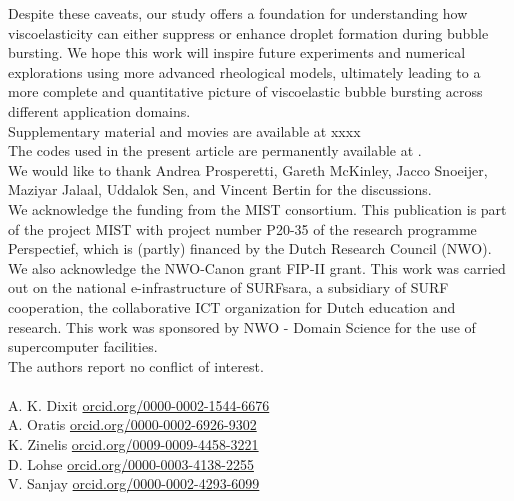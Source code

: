 \documentclass{jfm}
\newcommand{\bb}{\color{black} \normalfont}
\begin{document}
Despite these caveats, our study offers a foundation for understanding how viscoelasticity can either suppress or enhance droplet formation during bubble bursting. We hope this work will inspire future experiments and numerical explorations using more advanced rheological models, ultimately leading to a more complete and quantitative picture of viscoelastic bubble bursting across different application domains.
\bb\\


 \label{SM} Supplementary material and movies are available at xxxx \\

 The codes used in the present article are permanently available at \citet{Sanjay2024code}.\\

 We would like to thank Andrea Prosperetti, Gareth McKinley, Jacco Snoeijer, Maziyar Jalaal, Uddalok Sen, and Vincent Bertin for the discussions.\\

 We acknowledge the funding from the MIST consortium. This publication is part of the project MIST with project number P20-35 of the research programme Perspectief, which is (partly) financed by the Dutch Research Council (NWO). We also acknowledge the NWO-Canon grant FIP-II grant. This work was carried out on the national e-infrastructure of SURFsara, a subsidiary of SURF cooperation, the collaborative ICT organization for Dutch education and research. This work was sponsored by NWO - Domain Science for the use of supercomputer facilities.\\

 The  authors report no conflict of interest. \\

 \\
A. K. Dixit \href{https://orcid.org/0000-0002-1544-6676}{orcid.org/0000-0002-1544-6676}\\
A. Oratis \href{https://orcid.org/0000-0002-6926-9302}{orcid.org/0000-0002-6926-9302} \\
K. Zinelis \href{https://orcid.org/0009-0009-4458-3221}{orcid.org/0009-0009-4458-3221} \\
D. Lohse \href{https://orcid.org/0000-0003-4138-2255}{orcid.org/0000-0003-4138-2255}\\
V. Sanjay \href{https://orcid.org/0000-0002-4293-6099}{orcid.org/0000-0002-4293-6099}\\
\end{document}
